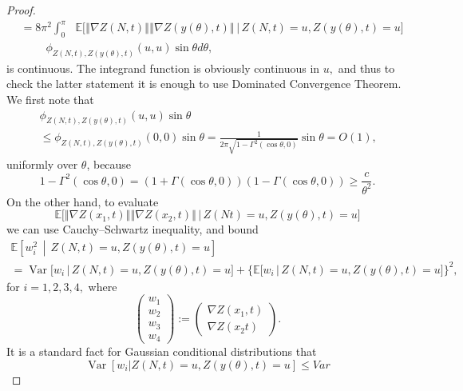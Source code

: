 \documentclass[AHL,Unicode,longabstracts,published]{cedram}
\newcommand{\bbE}{\mathbb{E}}
\DeclareMathOperator{\Var}{Var}
\begin{document}
\begin{proof}
\begin{align*}
&=8\pi ^{2}\int_{0}^{\pi }\text{ }\bbE\Big[ \left\Vert \nabla Z(N,t)\right\Vert \left\Vert \nabla Z(y(\theta),t)\right\Vert \,\Big|\, Z(N,t)=u,Z(y(\theta),t)=u\Big]\\
&\qquad\;\phi _{Z(N,t),Z(y(\theta),t)}(u,u)\sin
\theta d\theta \text{,}
\end{align*}
is continuous. The integrand function is obviously continuous in $u,$ and thus to check the latter statement it is enough to use Dominated Convergence Theorem. We first note that
\begin{multline*}
\phi _{Z(N,t),Z(y(\theta),t)}(u,u)\sin \theta\\
\leq \phi _{Z(N,t),Z(y(\theta),t)}(0,0)\sin \theta 
=\frac{1}{2\pi \sqrt{1-\Gamma^{2}(\cos \theta,0)}}\sin \theta =O(1)\text{,}
\end{multline*}
uniformly over $\theta $, because
\begin{equation*}
1-\Gamma ^{2}(\cos \theta,0)=(1+\Gamma (\cos \theta,0))(1-\Gamma (\cos
\theta,0))\geq \frac{c}{\theta ^{2}}\text{.}
\end{equation*}
On the other hand, to evaluate
\begin{equation*}
\bbE\Big[\left\Vert \nabla Z(x_{1},t)\right\Vert \left\Vert
\nabla Z(x_{2},t)\right\Vert \,|\, Z(Nt)=u,Z(y(\theta),t)=u\Big]
\end{equation*}
we can use Cauchy--Schwartz inequality, and bound
\begin{multline*}
\bbE\left[ w_{i}^{2}\,\middle|\, Z(N,t)=u,Z(y(\theta),t)=u
\right] \\
=\Var\big[w_{i}\,\big|\, Z(N,t)=u,Z(y(\theta),t)=u\big] +\big\{ \bbE\big[w_{i}\,\big|\, Z(N,t)=u,Z(y(\theta),t)=u
\big] \big\} ^{2},
\end{multline*}
for $i=1,2,3,4,$ where
\begin{equation*}
\left(
\begin{array}{c}
w_{1} \\
w_{2} \\
w_{3} \\
w_{4}
\end{array}
\right) :=\left(
\begin{array}{c}
\nabla Z(x_{1},t) \\
\nabla Z(x_{2}t)
\end{array}
\right) \text{.}
\end{equation*}
It is a standard fact for Gaussian conditional distributions that
\begin{equation*}
\Var\left[\left. w_{i}\right\vert Z(N,t)=u,Z(y(\theta),t)=u\right] \leq Var

\end{equation*}
\end{proof}
\end{document}
